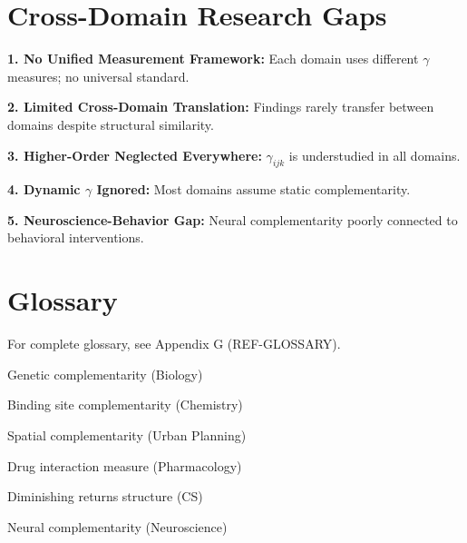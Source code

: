 \section{Cross-Domain Research Gaps}
\label{sec:gaps}

\begin{tcolorbox}[colback=red!5!white,colframe=red!75!black,title=\textbf{Identified Research Gaps}]

\textbf{1. No Unified Measurement Framework:}
Each domain uses different $\gamma$ measures; no universal standard.

\textbf{2. Limited Cross-Domain Translation:}
Findings rarely transfer between domains despite structural similarity.

\textbf{3. Higher-Order Neglected Everywhere:}
$\gamma_{ijk}$ is understudied in all domains.

\textbf{4. Dynamic $\gamma$ Ignored:}
Most domains assume static complementarity.

\textbf{5. Neuroscience-Behavior Gap:}
Neural complementarity poorly connected to behavioral interventions.

\end{tcolorbox}

\section{Glossary}
\label{sec:glossary-catalog}

For complete glossary, see Appendix G (REF-GLOSSARY).

\begin{description}[noitemsep]
    \item[Epistasis] Genetic complementarity (Biology)
    \item[Cooperativity] Binding site complementarity (Chemistry)
    \item[Agglomeration] Spatial complementarity (Urban Planning)
    \item[Combination Index] Drug interaction measure (Pharmacology)
    \item[Submodularity] Diminishing returns structure (CS)
    \item[Integration] Neural complementarity (Neuroscience)
\end{description}

